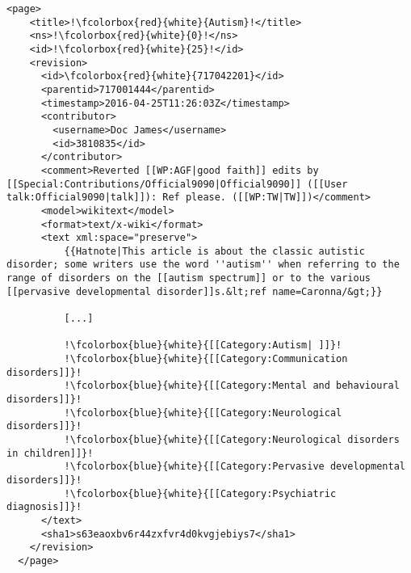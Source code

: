 
\lstset{style=codestyle, language=XML}
\begin{lstlisting}[caption= Auszug einer Artikelseite im XML Format. Rot markierte Bereiche sind durch das XML Format extrahierbar. Blau markierte Bereiche sind im Flie"stext einer Wikipediaseite und m"ussen mit regul"aren Ausdr"ucken extrahiert werden., label=xml-artikel]
  <page>
    <title>!\fcolorbox{red}{white}{Autism}!</title>
    <ns>!\fcolorbox{red}{white}{0}!</ns>
    <id>!\fcolorbox{red}{white}{25}!</id>
    <revision>
      <id>\fcolorbox{red}{white}{717042201}</id>
      <parentid>717001444</parentid>
      <timestamp>2016-04-25T11:26:03Z</timestamp>
      <contributor>
        <username>Doc James</username>
        <id>3810835</id>
      </contributor>
      <comment>Reverted [[WP:AGF|good faith]] edits by [[Special:Contributions/Official9090|Official9090]] ([[User talk:Official9090|talk]]): Ref please. ([[WP:TW|TW]])</comment>
      <model>wikitext</model>
      <format>text/x-wiki</format>
      <text xml:space="preserve">
          {{Hatnote|This article is about the classic autistic disorder; some writers use the word ''autism'' when referring to the range of disorders on the [[autism spectrum]] or to the various [[pervasive developmental disorder]]s.&lt;ref name=Caronna/&gt;}}
          
          [...]
          
          !\fcolorbox{blue}{white}{[[Category:Autism| ]]}!
          !\fcolorbox{blue}{white}{[[Category:Communication disorders]]}!
          !\fcolorbox{blue}{white}{[[Category:Mental and behavioural disorders]]}!
          !\fcolorbox{blue}{white}{[[Category:Neurological disorders]]}!
          !\fcolorbox{blue}{white}{[[Category:Neurological disorders in children]]}!
          !\fcolorbox{blue}{white}{[[Category:Pervasive developmental disorders]]}!
          !\fcolorbox{blue}{white}{[[Category:Psychiatric diagnosis]]}!
      </text>
      <sha1>s63eaoxbv6r44zxfvr4d0kvgjebiys7</sha1>
    </revision>
  </page>
\end{lstlisting}

